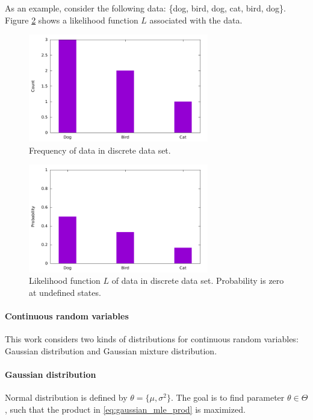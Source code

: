 \documentclass[thesis=B,english]{FITthesis}[2012/06/26]
\begin{document}
As an example, consider the following data: \{dog, bird, dog, cat, bird, dog\}. Figure \ref{fig:discrete_mle_prob} shows a likelihood function $L$ associated with the data.

\begin{figure}
	\centering
 	\includegraphics[width=0.7\textwidth]{discrete_mle_hist}
 	\caption{Frequency of data in discrete data set.}
 	\label{fig:discrete_mle_hist}
\end{figure}

\begin{figure}
	\centering
 	\includegraphics[width=0.7\textwidth]{discrete_mle_prob}
 	\caption{Likelihood function $L$ of data in discrete data set. Probability is zero at undefined states.}
 	\label{fig:discrete_mle_prob}
\end{figure}

\paragraph{Continuous random variables}
This work considers two kinds of distributions for continuous random variables: Gaussian distribution and Gaussian mixture distribution.

\paragraph{Gaussian distribution}
Normal distribution is defined by $\theta = \{\mu, \sigma^2\}$. The goal is to find parameter $\theta \in \Theta$, such that the product in \ref{eq:gaussian_mle_prod} is maximized.
\end{document}
